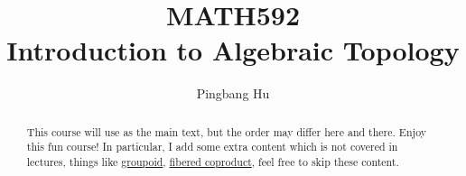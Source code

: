 \documentclass[a4paper]{article}
\author{Pingbang Hu}
\title{MATH592\\Introduction to Algebraic Topology}
\begin{document}
\maketitle

\begin{abstract}
	This course will use \cite{hatcher2002algebraic} as the main text, but the order may differ here and there. Enjoy this fun
	course! In particular, I add some extra content which is not covered in lectures, things like \hyperref[def:groupoid]{groupoid}, \hyperref[def:fibered-coproduct]{fibered coproduct},
	feel free to skip these content.
\end{abstract}

\tableofcontents


\newpage
\appendix
\appendixpage



\newpage
\printbibliography
\end{document}
